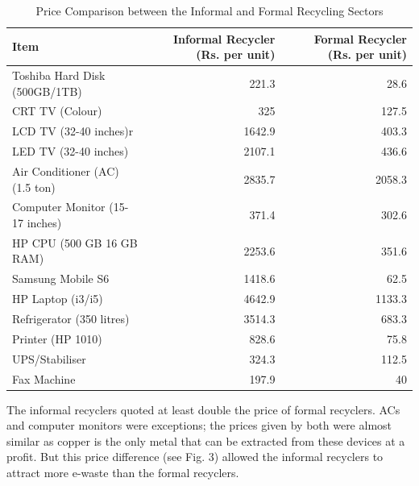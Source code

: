 \documentclass[a4paper, 12pt]{article}
\begin{document}
                    
                    \begin{table}[htbp]
                      \centering
                      \caption{Price Comparison between the Informal and Formal Recycling Sectors}
                        \begin{tabular}{lrr}
                        Item  & \multicolumn{1}{p{8em}}{Informal Recycler \newline{}(Rs. per unit)} & \multicolumn{1}{p{8em}}{Formal Recycler \newline{}(Rs. per unit)} \\
                        \midrule
                        Toshiba Hard Disk (500GB/1TB) & 221.3 & 28.6 \\
                        CRT TV (Colour) & 325   & 127.5 \\
                        LCD TV (32-40 inches)r & 1642.9 & 403.3 \\
                        LED TV (32-40 inches) & 2107.1 & 436.6 \\
                        Air Conditioner (AC) (1.5 ton) & 2835.7 & 2058.3 \\
                        Computer Monitor (15-17 inches) & 371.4 & 302.6 \\
                        HP CPU (500 GB 16 GB RAM) & 2253.6 & 351.6 \\
                        Samsung Mobile S6 & 1418.6 & 62.5 \\
                        HP Laptop (i3/i5) & 4642.9 & 1133.3 \\
                        Refrigerator (350 litres) & 3514.3 & 683.3 \\
                        Printer (HP 1010) & 828.6 & 75.8 \\
                        UPS/Stabiliser  & 324.3 & 112.5 \\
                        Fax Machine  & 197.9 & 40 \\
                        \end{tabular}%
                      \label{tab:addlabel}%
                    \end{table}%
                    
                    The informal recyclers quoted at least double the price of formal recyclers. ACs and computer monitors were exceptions; the prices given by both were almost similar as copper is the only metal that can be extracted from these devices at a profit. But this price difference (see Fig. 3) allowed the informal recyclers to attract more e-waste than the formal recyclers. \\
                    
\end{document}
